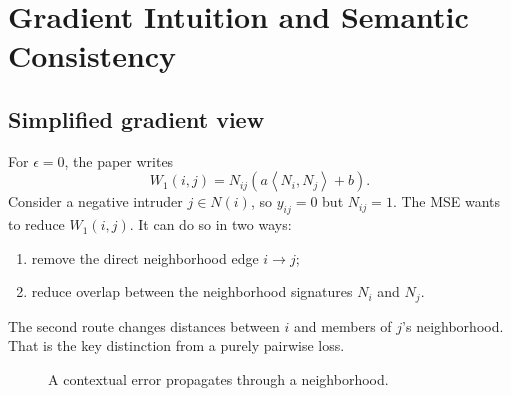 \documentclass[11pt,oneside,openany]{book}
\theoremstyle{myplain}
\theoremstyle{definition}
\newcommand{\inner}[2]{\left\langle #1,#2\right\rangle}
\newcommand{\paperEq}[1]{\tag{P#1}}
\begin{document}
\chapter{Gradient Intuition and Semantic Consistency}
\label{chap:gradients}

\section{Simplified gradient view}

For $\epsilon=0$, the paper writes
\begin{equation*}
  W_1(i,j)=N_{ij}\left(a\inner{N_i}{N_j}+b\right).
\paperEq{8}
\label{eq:paper8}
\end{equation*}
Consider a negative intruder $j\in N(i)$, so $y_{ij}=0$ but $N_{ij}=1$. The MSE wants to reduce $W_1(i,j)$. It can do so in two ways:

\begin{enumerate}[leftmargin=*,itemsep=4pt]
  \item remove the direct neighborhood edge $i\to j$;
  \item reduce overlap between the neighborhood signatures $N_i$ and $N_j$.
\end{enumerate}
The second route changes distances between $i$ and members of $j$'s neighborhood. That is the key distinction from a purely pairwise loss.

\begin{figure}[H]
\centering
{}
\caption{A contextual error propagates through a neighborhood.}
\label{fig:context-gradient}
\end{figure}
\end{document}
